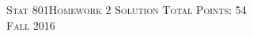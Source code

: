 \documentclass[11pt]{article}
\begin{document}
\large \noindent \textsc{Stat 801}\hfill \Large{\textsc{Homework 2 Solution}} \hfill \textsc{Total Points: 54}\\
\large \textsc{Fall 2016} \\

\begin{enumerate}



\vspace{.25cm}

\newpage

\vspace{.25cm}



\end{enumerate}
\end{document}
